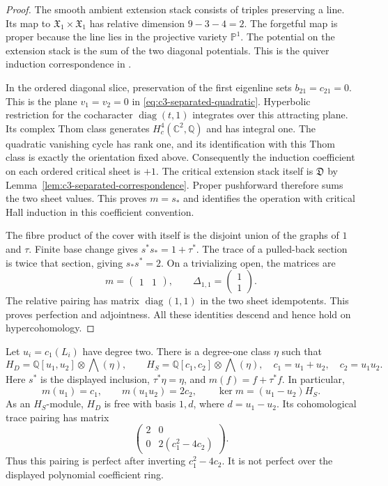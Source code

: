 \begin{proof}
The smooth ambient extension stack consists of triples preserving
a line. Its map to $\mathfrak X_1\times\mathfrak X_1$ has relative
dimension $9-3-4=2$. The forgetful map is proper because the line
lies in the projective variety $\mathbb P^1$.
The potential on the extension stack is the sum of the two
diagonal potentials. This is the quiver induction correspondence
in \cite[\S1, equation~(1.1)]{KPS}.

In the ordered diagonal slice, preservation of the first eigenline
sets $b_{21}=c_{21}=0$. This is the plane $v_1=v_2=0$
in \eqref{eq:c3-separated-quadratic}. Hyperbolic restriction for the
cocharacter $\operatorname{diag}(t,1)$ integrates over this attracting
plane. Its complex Thom class generates
$H_c^4(\mathbb C^2,\mathbb Q)$ and has integral one.
The quadratic vanishing cycle has rank one, and its identification
with this Thom class is exactly the orientation fixed above.
Consequently the induction coefficient on each ordered critical
sheet is $+1$. The critical extension stack itself is $\mathfrak D$
by Lemma~\ref{lem:c3-separated-correspondence}. Proper pushforward
therefore sums the two sheet values. This proves $m=s_*$ and
identifies the operation with critical Hall induction in this
coefficient convention.

The fibre product of the cover with itself is the disjoint union
of the graphs of $1$ and $\tau$. Finite base change gives
$s^*s_*=1+\tau^*$. The trace of a pulled-back section is twice that
section, giving $s_*s^*=2$. On a trivializing open, the matrices are
\[
 m=\begin{pmatrix}1&1\end{pmatrix},\qquad
 \Delta_{1,1}=\begin{pmatrix}1\\1\end{pmatrix}.
\]
The relative pairing has matrix $\operatorname{diag}(1,1)$ in the
two sheet idempotents. This proves perfection and adjointness.
All these identities descend and hence hold on hypercohomology.
\end{proof}

\begin{proposition}
\label{prop:c3-separated-trace}
Let $u_i=c_1(L_i)$ have degree two. There is a degree-one class
$\eta$ such that
\[
 H_D=\mathbb Q[u_1,u_2]\otimes\bigwedge(\eta),\qquad
 H_S=\mathbb Q[c_1,c_2]\otimes\bigwedge(\eta),
 \quad c_1=u_1+u_2,\quad c_2=u_1u_2.
\]
Here $s^*$ is the displayed inclusion, $\tau^*\eta=\eta$, and
$m(f)=f+\tau^*f$. In particular,
\[
 m(u_1)=c_1,\qquad m(u_1u_2)=2c_2,\qquad
 \ker m=(u_1-u_2)H_S.
\]
As an $H_S$-module, $H_D$ is free with basis $1,d$, where
$d=u_1-u_2$. Its cohomological trace pairing has matrix
\[
 \begin{pmatrix}2&0\\0&2(c_1^2-4c_2)\end{pmatrix}.
\]
Thus this pairing is perfect after inverting $c_1^2-4c_2$.
It is not perfect over the displayed polynomial coefficient ring.
\end{proposition}

